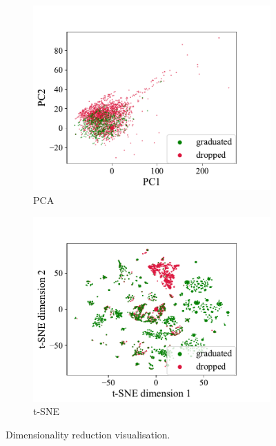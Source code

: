 \documentclass{article}
\begin{document}
\begin{figure}[t!]
  \centering
  \begin{subfigure}{0.49\textwidth}
    \includegraphics[width=\linewidth]{../gfx/pca.pdf}
    \caption{PCA}
    \label{fig:pca}
  \end{subfigure}
  \begin{subfigure}{0.49\textwidth}
    \includegraphics[width=\linewidth]{../gfx/tsne.pdf}
    \caption{t-SNE}
    \label{fig:tsne}
  \end{subfigure}
  \captionsetup{belowskip=-10pt}
  \caption{Dimensionality reduction visualisation.}
  \label{fig:reduction}
\end{figure}
\end{document}
